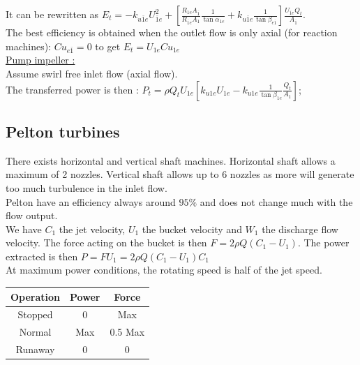 \documentclass[../main.tex]{subfiles}
\begin{document}
It can be rewritten as $E_t = -k_{u\overline{1}e} U_{\overline{1}e}^2 + [\frac{R_{1e} A_{\overline{1}}}{R_{\overline{1}e} A_1} \frac{1}{\tan \alpha_{1e}} + k_{u \overline{1}e} \frac{1}{\tan \beta_{e\overline{1}}}] \frac{U_{\overline{1}e} Q_t}{A_{\overline{1}}} $.\\

The best efficiency is obtained when the outlet flow is only axial (for reaction machines): $Cu_{e\overline{1}} = 0$ to get $E_t = U_{1e} Cu_{1e}$\\

\quad \underline{Pump impeller :}\\
Assume swirl free inlet flow (axial flow).\\

The transferred power is then : $P_t = \rho Q_t U_{1e} [k_{u1e} U_{1e} - k_{u1e} \frac{1}{\tan \beta_{1e}} \frac{Q_t}{A_1}]$;\\


\subsection{Pelton turbines}
There exists horizontal and vertical shaft machines. Horizontal shaft allows a maximum of 2 nozzles. Vertical shaft allows up to 6 nozzles as more will generate too much turbulence in the inlet flow. \\
Pelton have an efficiency always around $95\%$ and does not change much with the flow output.\\

We have $C_1$ the jet velocity, $U_1$ the bucket velocity and $W_1$ the discharge flow velocity. The force acting on the bucket is then $F = 2\rho Q (C_1-U_1)$. The power extracted is then $P = FU_1 = 2\rho Q (C_1- U_1) C_1$\\

\warning At maximum power conditions, the rotating speed is half of the jet speed.\\
\begin{table}[hbt!]
    \centering
    \begin{tabular}{|c|c|c|}
        \hline
        Operation & Power & Force \\
        \hline
        Stopped & 0 & Max\\
        \hline

        Normal & Max & 0.5 Max\\
        \hline
        Runaway & 0 & 0\\ \hline
    \end{tabular}
\end{table}
\end{document}
